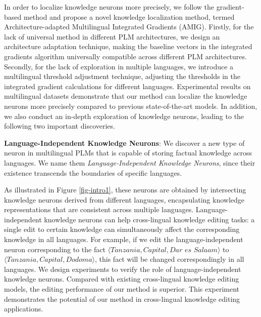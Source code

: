 \documentclass[]{article}
\begin{document}
In order to localize knowledge neurons more precisely, we follow the gradient-based method and propose a novel knowledge localization method, termed Architecture-adapted Multilingual Integrated Gradients (AMIG).
Firstly, for the lack of universal method in different PLM architectures, we design an architecture adaptation technique, making the baseline vectors in the integrated gradients algorithm \cite{rigorousIG} universally compatible across different PLM architectures. Secondly, for the lack of exploration in multiple languages, we introduce a multilingual threshold adjustment technique, adjusting the thresholds in the integrated gradient calculations for different languages. Experimental results on multilingual datasets demonstrate that our method can localize the knowledge neurons more precisely compared to previous state-of-the-art models. In addition, we also conduct an in-depth exploration of knowledge neurons, leading to the following two important discoveries.

\textbf{Language-Independent Knowledge Neurons}: We discover a new type of neuron in multilingual PLMs that is capable of storing factual knowledge across languages.
We name them \textit{Language-Independent Knowledge Neurons}, since their existence transcends the boundaries of specific languages.

As illustrated in Figure \ref{fig-intro1}, these neurons are obtained by intersecting knowledge neurons derived from different languages, encapsulating knowledge representations that are consistent across multiple languages. Language-independent knowledge neurons can help cross-lingual knowledge editing tasks: a single edit to certain knowledge can simultaneously affect the corresponding knowledge in all languages. For example, if we edit the language-independent neuron corresponding to the fact $\langle  \textit{Tanzania}, \textit{Capital}, \textit{Dar es Salaam} \rangle$ to $\langle \textit{Tanzania}, \textit{Capital}, \textit{Dodoma} \rangle$, this fact will be changed correspondingly in all languages.
We design experiments to verify the role of language-independent knowledge neurons. Compared with existing cross-lingual knowledge editing models, the editing performance of our method is superior. This experiment demonstrates the potential of our method in cross-lingual knowledge editing applications.
\end{document}
